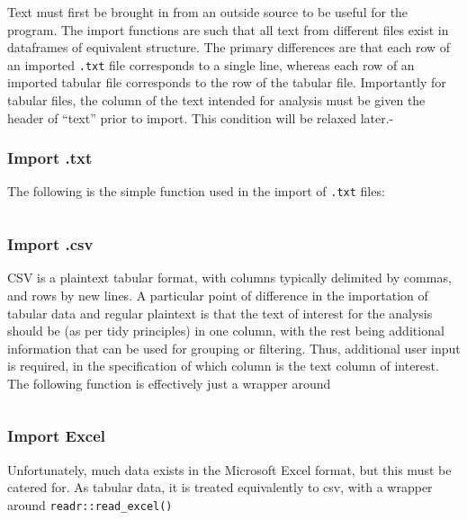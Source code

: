 \documentclass[11pt, a4paper, oneside]{report}
\begin{document}
Text must first be brought in from an outside source to be useful for
the program. The import functions are such that all text from
different files exist in dataframes of equivalent structure. The
primary differences are that each row of an imported \texttt{.txt}
file corresponds to a single line, whereas each row of an imported
tabular file corresponds to the row of the tabular file. Importantly
for tabular files, the column of the text intended for analysis must
be given the header of ``text'' prior to import. This condition will
be relaxed later.-

\subsubsection{Import .txt}

The following is the simple function used in the import of \texttt{.txt} files:


\inputminted[frame=lines,fontsize=\scriptsize,xleftmargin=\parindent,linenos]{R}{R/import-txt.R}


\subsubsection{Import .csv}

CSV is a plaintext tabular format, with columns typically delimited by
commas, and rows by new lines. A particular point of difference in the
importation of tabular data and regular plaintext is that the text of
interest for the analysis should be (as per tidy principles) in one
column, with the rest being additional information that can be used
for grouping or filtering. Thus, additional user input is required, in
the specification of which column is the text column of interest. The
following function is effectively just a wrapper around

\inputminted[frame=lines,fontsize=\scriptsize,xleftmargin=\parindent,linenos]{R}{R/import-csv.R}

\subsubsection{Import Excel}

Unfortunately, much data exists in the Microsoft Excel format, but
this must be catered for. As tabular data, it is treated equivalently
to csv, with a wrapper around \texttt{readr::read_excel()}
\end{document}
